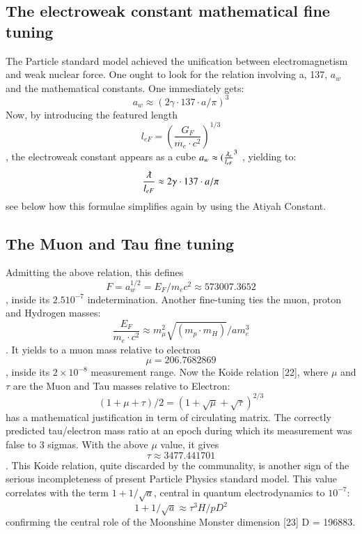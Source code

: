 \documentclass[twoside,draft]{article}
\begin{document}
\begin{sloppypar}
{\subsection {The electroweak constant mathematical fine tuning}

The Particle standard model achieved the unification between electromagnetism and weak
nuclear force. One ought to look for the relation involving a, 137, $a_{w}$ and the mathematical constants. One
immediately gets:
\begin{equation}
a_{w} \approx (2\gamma \cdot 137 \cdot a/\pi)^{3}
\end{equation}
Now, by introducing the featured length $$l_{eF} = (\frac{G_{F}}{m_{e} \cdot c^{2}})^{1/3}$$ , the electroweak constant appears as
a cube $a_{w} \approx (\frac{\lambdabar_{e}}{l_{eF}}^{3}$ , yielding to:
\begin{equation}
\frac{\lambdabar}{l_{eF}} \approx 2\gamma \cdot 137 \cdot a/\pi
\end{equation}
see below how this formulae simplifies again by using the Atiyah Constant.

\subsection {The Muon and Tau fine tuning}

Admitting the above relation, this defines \begin{equation} 
F = a_{w}^{1/2} = E_{F} /m_{e} c^{2} \approx 573007.3652
\end{equation}, inside its $2.5 10^{-7}$
indetermination. Another fine-tuning ties the muon, proton and Hydrogen masses: 
\begin{equation}
\frac{E_{F}}{m_{e} \cdot c^{2}} \approx
m_{\mu}^{2} \sqrt{(m_{p} \cdot m_{H})}/am_{e}^{3}
\end{equation}. 
It yields to a muon mass relative to electron 
\begin{equation}
\mu = 206.7682869
\end{equation}, inside its
$2 \times 10^{-8}$ measurement range.
Now the Koide relation [22], where $\mu$ and $\tau$ are the Muon and Tau masses relative to Electron:
\begin{equation}
(1 + \mu + \tau)/2 = (1 + \sqrt\mu + \sqrt\tau)^{2/3}
\end{equation}
has a mathematical justification in term of circulating matrix. The correctly predicted tau/electron
mass ratio at an epoch during which its measurement was false to 3 sigmas. With the above $\mu$ value, it
gives $$\tau \approx 3477.441701$$. This Koide relation, quite discarded by the communality, is another sign of
the serious incompleteness of present Particle Physics standard model. This value correlates with the
term $1+1/\sqrt{a}$, central in quantum electrodynamics to $10^{-7}$:
\begin{equation}
1+1/\sqrt{a} \approx \tau^{3} H/pD^{2}
\end{equation}
confirming the central role of the Moonshine Monster dimension [23] D = 196883.

}
\end{sloppypar}
\end{document}
